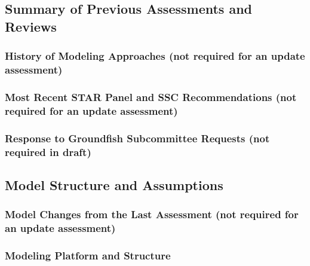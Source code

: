 \documentclass[11pt,
  english,
  letterpaper,
]{article}
\begin{document}
\hypertarget{summary-of-previous-assessments-and-reviews}{%
\subsection{Summary of Previous Assessments and Reviews}\label{summary-of-previous-assessments-and-reviews}}

\hypertarget{history-of-modeling-approaches-not-required-for-an-update-assessment}{%
\subsubsection{History of Modeling Approaches (not required for an update assessment)}\label{history-of-modeling-approaches-not-required-for-an-update-assessment}}

\hypertarget{most-recent-star-panel-and-ssc-recommendations-not-required-for-an-update-assessment}{%
\subsubsection{Most Recent STAR Panel and SSC Recommendations (not required for an update assessment)}\label{most-recent-star-panel-and-ssc-recommendations-not-required-for-an-update-assessment}}

\hypertarget{response-to-groundfish-subcommittee-requests-not-required-in-draft}{%
\subsubsection{Response to Groundfish Subcommittee Requests (not required in draft)}\label{response-to-groundfish-subcommittee-requests-not-required-in-draft}}

\hypertarget{model-structure-and-assumptions}{%
\subsection{Model Structure and Assumptions}\label{model-structure-and-assumptions}}

\hypertarget{model-changes-from-the-last-assessment-not-required-for-an-update-assessment}{%
\subsubsection{Model Changes from the Last Assessment (not required for an update assessment)}\label{model-changes-from-the-last-assessment-not-required-for-an-update-assessment}}

\hypertarget{modeling-platform-and-structure}{%
\subsubsection{Modeling Platform and Structure}\label{modeling-platform-and-structure}}
\end{document}
